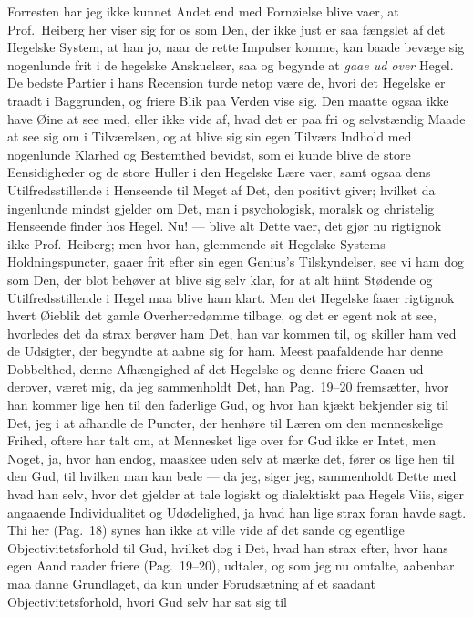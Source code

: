 \documentclass[12pt,a4paper]{book}
\newcommand{\apage}[1]{\marginnote{\footnotesize\textit{[#1]}}}
\begin{document}
Forresten har jeg ikke kunnet Andet end med Fornøielse blive vaer, at
Prof.\ Heiberg her viser sig for os som Den, der ikke just er saa fængslet
af det Hegelske System, at han jo, naar de rette Impulser komme, kan baade
bevæge sig nogenlunde frit \apage{10} i de hegelske Anskuelser, saa og begynde at \emph{gaae
ud over} Hegel. De bedste Partier i hans Recension turde netop være de,
hvori det Hegelske er traadt i Baggrunden, og friere Blik paa Verden vise
sig. Den maatte ogsaa ikke have Øine at see med, eller ikke vide af, hvad
det er paa fri og selvstændig Maade at see sig om i Tilværelsen, og at
blive sig sin egen Tilværs Indhold med nogenlunde Klarhed og Bestemthed
bevidst, som ei kunde blive de store Eensidigheder og de store Huller i den
Hegelske Lære vaer, samt ogsaa dens Utilfredsstillende i Henseende til
Meget af Det, den positivt giver; hvilket da ingenlunde mindst gjelder om
Det, man i psychologisk, moralsk og christelig Henseende finder hos Hegel.
Nu! --- blive alt Dette vaer, det gjør nu rigtignok ikke Prof.\ Heiberg;
men hvor han, glemmende sit Hegelske Systems Holdningspuncter, gaaer frit
efter sin egen Genius's Tilskyndelser, see vi ham dog som Den, der blot
behøver at blive sig selv klar, for at alt hiint Stødende og
Utilfredsstillende i Hegel maa blive ham klart. Men det Hegelske faaer
rigtignok hvert Øieblik det gamle Overherredømme tilbage, og det er egent
nok at see, hvorledes det da strax berøver ham Det, han var kommen til, og
skiller ham ved de Udsigter, der begyndte at aabne sig for ham. Meest
paafaldende har denne Dobbelthed, denne Afhængighed af det Hegelske og
denne friere Gaaen ud derover, været mig, da jeg sammenholdt Det, han
Pag.\ 19--20 fremsætter, hvor han kommer lige hen til den faderlige Gud, og
hvor han kjækt bekjender sig til Det, jeg i at afhandle de Puncter, der
henhøre til Læren om den menneskelige Frihed, oftere har talt om, at
Mennesket lige over for Gud ikke er Intet, men Noget, ja, hvor han endog,
maaskee uden selv at mærke det, fører os lige hen til den Gud, til hvilken
man kan bede --- da jeg, siger jeg, sammenholdt Dette med hvad han selv,
hvor det gjelder at tale logiskt og dialektiskt paa Hegels Viis, siger
angaaende Individualitet og Udødelighed, ja hvad han lige strax foran havde
sagt. Thi her \apage{11} (Pag.\ 18) synes han ikke at ville vide af det sande og
egentlige Objectivitetsforhold til Gud, hvilket dog i Det, hvad han strax
efter, hvor hans egen Aand raader friere (Pag.\ 19--20), udtaler, og som
jeg nu omtalte, aabenbar maa danne Grundlaget, da kun under Forudsætning af
et saadant Objectivitetsforhold, hvori Gud selv har sat sig til
\end{document}
